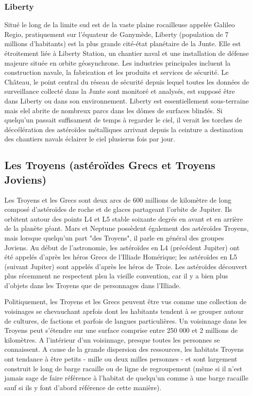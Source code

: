 \subsubsection{Liberty} \label{sec:liberty} 

Situé le long de la limite sud est de la vaste plaine rocailleuse appelée Galileo Regio, pratiquement sur l'équateur de Ganymède, Liberty (population de 7 millions d'habitants) est la plus grande cité-état planétaire de la Junte. Elle est étroitement liée à Liberty Station, un chantier naval et une installation de défense majeure située en orbite géosynchrone. Les industries principales incluent la construction navale, la fabrication et les produits et services de sécurité. Le Château, le point central du réseau de sécurité depuis lequel toutes les données de surveillance collecté dans la Junte sont monitoré et analysés, est supposé être dans Liberty ou dans son environnement. Liberty est essentiellement sous-terraine mais elel abrite de nombreux parcs dans les dômes de surfaces blindés. Si quelqu'un passait suffisament de temps à regarder le ciel, il verait les torches de déccélération des astéroïdes métalliques arrivant depuis la ceinture a destination des chantiers navals éclairer le ciel plusierus fois par jour. 

\subsection{Les Troyens (astéroïdes Grecs et Troyens Joviens)} \label{sec:troj-jovi-troj} 

Les Troyens et les Grecs sont deux arcs de 600 millions de kilomètre de long composé d'astéroïdes de roche et de glaces partageant l'orbite de Jupiter. Ils orbitent autour des points L4 et L5 stable soixante degrés en avant et en arrière de la planète géant. Mars et Neptune possèdent également des astéroïdes Troyens, mais lorsque quelqu'un part "des Troyens", il parle en général des groupes Joviens. Au début de l'astronomie, les astéroïdes en L4 (précédent Jupiter) ont été appelés d'après les héros Grecs de l'Illiade Homérique; les astéroïdes en L5 (suivant Jupiter) sont appelés d'après les héros de Troie. Les astéroïdes découvert plus récemment ne respectent plsu la vieille convention, car il y a bien plus d'objets dans les Troyens que de personnages dans l'Illiade. 

Politiquement, les Troyens et les Grecs peuvent être vus comme une collection de voisinages se chevauchant aprfois dont les habitants tendent à se grouper autour de cultures, de factions et parfois de langues particulières. Un voisinnage dans les Troyens peut s'étendre sur une surface comprise entre 250 000 et 2 millions de kilomètres. A l'intérieur d'un voisinnage, presque toutes les personnes se connaissent. A cause de la grande dispersion des ressources, les habitats Troyens ont tendance à être petits - mille ou deux milles personnes - et sont largement construit le long de barge racaille ou de ligne de regroupement (même si il n'est jamais sage de faire référence à l'habitat de quelqu'un comme à une barge racaille sauf si ils y font d'abord référence de cette manière). 

